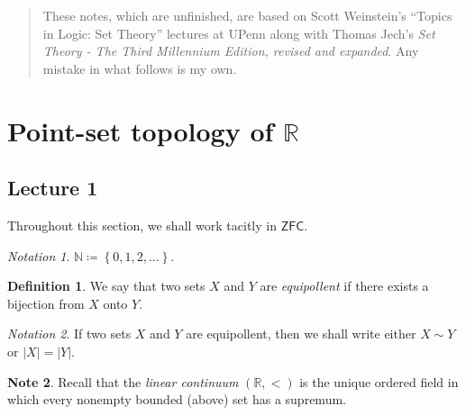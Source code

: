 \documentclass[10pt,letterpaper,cm]{nupset}
\theoremstyle{definition}
\newtheorem{definition}{Definition}[subsection]
\newtheorem{note}[definition]{Note}
\theoremstyle{theorem}
\theoremstyle{remark}
\newtheorem*{notation}{Notation}
\newcommand{\N}{\mathbb N}
\newcommand{\R}{\mathbb R}
\newcommand{\1}{\mathbf{1}}
\newcommand{\0}{\vec 0}
\newcommand{\zfc}{\mathsf{ZFC}}
\begin{document}
\thispagestyle{empty}
\begin{abstract}
These notes, which are unfinished, are based on Scott Weinstein's ``Topics in Logic: Set Theory'' lectures at UPenn along with  Thomas Jech's \textit{Set Theory - The Third Millennium Edition, revised and expanded}. Any mistake in what follows is my own.
\end{abstract}

\tableofcontents
\newpage

\section{Point-set topology of $\R$}

\subsection{Lecture 1}

Throughout this section, we shall  work tacitly in $\zfc$.

\begin{notation}
$\N \coloneqq \left\{0,1,2, \ldots \right\}$.
\end{notation}

\begin{definition}
We say that two sets $X$ and $Y$ are \textit{equipollent} if there exists a bijection from $X$ onto $Y$. 
\end{definition}

\begin{notation}
If two sets $X$ and $Y$ are equipollent, then we shall write either $X \sim Y$ or $\left\lvert{X}\right\rvert = \left\lvert{Y}\right\rvert$.
\end{notation}

\begin{note}
Recall that the \textit{linear continuum} $\left(\R, <\right)$ is the unique ordered field in which every nonempty bounded (above) set has a supremum.  
\end{note}
\end{document}
